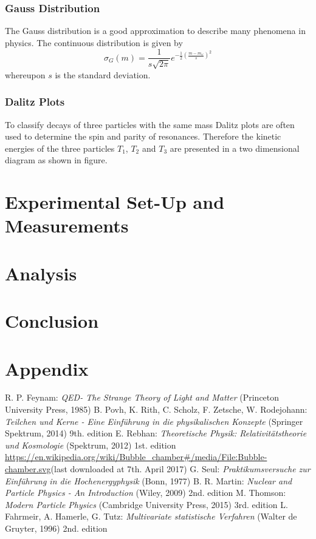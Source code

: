 \documentclass[10pt, a4paper, notitlepage, DIV=15]{scrartcl}
\begin{document}
\subsubsection{Gauss Distribution}
The Gauss distribution is a good approximation to describe many phenomena in physics. The continuous distribution is given by \cite{gauss}
\begin{equation}
	\sigma_G(m)=\frac{1}{s\sqrt{2\pi}}e^{-\frac{1}{2}\left( \frac{m-m_\omega}{s}\right)^2} 
\end{equation} 
whereupon $s$ is the standard deviation. 
\subsubsection{Dalitz Plots}
To classify decays of three particles with the same mass Dalitz plots are often used to determine the spin and parity of resonances. Therefore the kinetic energies of the three particles $T_1$, $T_2$ and $T_3$ are presented in a two dimensional diagram as shown in figure.
  
\section{Experimental Set-Up and Measurements}

\section{Analysis}

\section{Conclusion}

\section{Appendix}

\begin{thebibliography}{}
	R. P. Feynam: \textit{QED- The Strange Theory of Light and Matter} (Princeton University Press, 1985)
	B. Povh, K. Rith, C. Scholz, F. Zetsche, W. Rodejohann: \textit{Teilchen und Kerne - Eine Einführung in die physikalischen Konzepte} (Springer Spektrum, 2014) 9th. edition
	E. Rebhan: \textit{Theoretische Physik: Relativitätstheorie und Kosmologie} (Spektrum, 2012) 1st. edition
	\url{https://en.wikipedia.org/wiki/Bubble_chamber#/media/File:Bubble-chamber.svg}\newline (last downloaded at 7th. April 2017)
	G. Seul: \textit{Praktikumsversuche zur Einführung in die Hochenergyphysik} (Bonn, 1977)
	B. R. Martin: \textit{Nuclear and Particle Physics - An Introduction} (Wiley, 2009) 2nd. edition
	M. Thomson: \textit{Modern Particle Physics} (Cambridge University Press, 2015) 3rd. edition
	L. Fahrmeir, A. Hamerle, G. Tutz: \textit{Multivariate statistische Verfahren} (Walter de Gruyter, 1996) 2nd. edition
\end{thebibliography}
 
\end{document}
